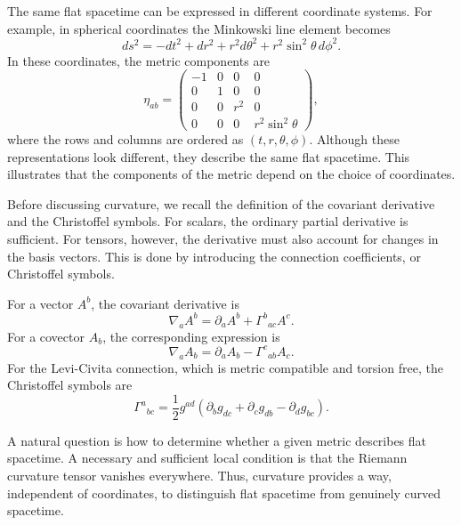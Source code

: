 The same flat spacetime can be expressed in different coordinate systems. For example, in spherical coordinates the Minkowski line element becomes
\begin{equation}
ds^2 = -dt^2 + dr^2 + r^2 d\theta^2 + r^2\sin^2\theta\, d\phi^2 .
\end{equation}
In these coordinates, the metric components are
\begin{equation}
\eta_{ab} =
\begin{pmatrix}
-1 & 0 & 0 & 0 \\
0 & 1 & 0 & 0 \\
0 & 0 & r^2 & 0 \\
0 & 0 & 0 & r^2 \sin^2\theta
\end{pmatrix},
\end{equation}
where the rows and columns are ordered as $(t,r,\theta,\phi)$. Although these representations look different, they describe the same flat spacetime. This illustrates that the components of the metric depend on the choice of coordinates.

Before discussing curvature, we recall the definition of the covariant derivative and the Christoffel symbols. For scalars, the ordinary partial derivative is sufficient. For tensors, however, the derivative must also account for changes in the basis vectors. This is done by introducing the connection coefficients, or Christoffel symbols.

For a vector $A^b$, the covariant derivative is
\begin{equation}
\nabla_a A^b
=
\partial_a A^b
+
\Gamma^b{}_{ac}A^c .
\end{equation}
For a covector $A_b$, the corresponding expression is
\begin{equation}
\nabla_a A_b
=
\partial_a A_b
-
\Gamma^c{}_{ab}A_c .
\end{equation}
For the Levi-Civita connection, which is metric compatible and torsion free, the Christoffel symbols are
\begin{equation}
\Gamma^a{}_{bc}
=
\frac{1}{2}g^{ad}
\left(
\partial_b g_{dc}
+
\partial_c g_{db}
-
\partial_d g_{bc}
\right).
\end{equation}

A natural question is how to determine whether a given metric describes flat spacetime. A necessary and sufficient local condition is that the Riemann curvature tensor vanishes everywhere. Thus, curvature provides a way, independent of coordinates, to distinguish flat spacetime from genuinely curved spacetime.

